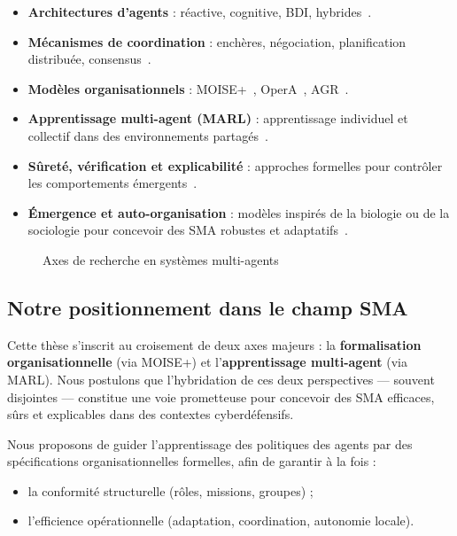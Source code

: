 \documentclass[ twoside,openright,titlepage,numbers=noenddot,headinclude,%
                footinclude=true,cleardoublepage=empty,abstractoff, %
                BCOR=5mm,paper=a4,fontsize=11pt,%
                french,american,%
                ]{scrreprt}
\begin{document}
\begin{itemize}
    \item \textbf{Architectures d’agents} : réactive, cognitive, BDI, hybrides~\cite{Georgeff1999}.
    \item \textbf{Mécanismes de coordination} : enchères, négociation, planification distribuée, consensus~\cite{Sandholm1999,Durfee1999}.
    \item \textbf{Modèles organisationnels} : MOISE+~\cite{Hubner2002,Hannoun2000}, OperA~\cite{Dignum2004}, AGR~\cite{Ferber2003}.
    \item \textbf{Apprentissage multi-agent (MARL)} : apprentissage individuel et collectif dans des environnements partagés~\cite{Zhang2021}.
    \item \textbf{Sûreté, vérification et explicabilité} : approches formelles pour contrôler les comportements émergents~\cite{Dennis2012,Boella2008}.
    \item \textbf{Émergence et auto-organisation} : modèles inspirés de la biologie ou de la sociologie pour concevoir des SMA robustes et adaptatifs~\cite{DiMarzoSerugendo2005,Heylighen2001}.
\end{itemize}

\begin{figure}[h]
    \centering
    \caption{Axes de recherche en systèmes multi-agents}
    \label{fig:panorama_sma}
\end{figure}

\subsection*{Notre positionnement dans le champ SMA}

Cette thèse s’inscrit au croisement de deux axes majeurs : la \textbf{formalisation organisationnelle} (via MOISE+) et l’\textbf{apprentissage multi-agent} (via MARL). Nous postulons que l’hybridation de ces deux perspectives — souvent disjointes — constitue une voie prometteuse pour concevoir des SMA efficaces, sûrs et explicables dans des contextes cyberdéfensifs.

Nous proposons de guider l’apprentissage des politiques des agents par des spécifications organisationnelles formelles, afin de garantir à la fois :
\begin{itemize}
    \item la conformité structurelle (rôles, missions, groupes) ;
    \item l’efficience opérationnelle (adaptation, coordination, autonomie locale).
\end{itemize}
\end{document}
